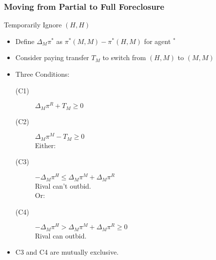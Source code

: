 \documentclass[aspectratio=169]{beamer}
\begin{document}
\begin{frame}
\frametitle{Moving from Partial to Full Foreclosure}
Temporarily Ignore $(H,H)$
\begin{itemize}
\item Define $\Delta_M \pi^{*}$ as $\pi^*(M,M) - \pi^*(H,M)$ for agent $ ^*$ 
\item Consider paying transfer $T_M$ to switch from $(H,M)$ to $(M,M)$
\item Three Conditions:
\begin{description}
\item[(C1)] $\Delta_M \pi^R+ T_M \geq 0$
\item[(C2)] $\Delta_M \pi^M - T_M \geq 0$\\
\hspace{-0.8in}Either:
\item[(C3)]  $-\Delta_M \pi^H  \leq \Delta_M \pi^M + \Delta_M \pi^R$ \\
Rival can't outbid.\\
\hspace{-0.8in}Or:
\item[(C4)] $-\Delta_M \pi^H  > \Delta_M \pi^M + \Delta_M \pi^R \geq 0$\\
Rival can outbid.
\end{description}
\item C3 and C4 are mutually exclusive. 
\end{itemize}
\end{frame}
\end{document}

